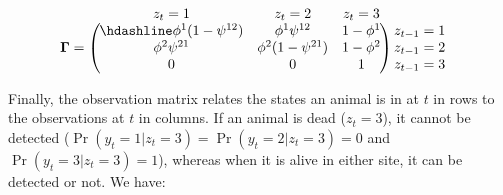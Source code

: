 \documentclass[
  12pt,
]{krantz}
\begin{document}
\[\begin{matrix}
& \\
\mathbf{\Gamma} =
    \left ( \vphantom{ \begin{matrix} 12 \\ 12 \\ 12 \end{matrix} } \right .
\end{matrix}
\hspace{-1.2em}
\begin{matrix}
    z_{t}=1 & z_{t}=2 & z_{t}=3 \\ \hdashline
\phi^1 (1-\psi^{12}) & \phi^1 \psi^{12} & 1 - \phi^1\\
\phi^2 \psi^{21} & \phi^2 (1-\psi^{21}) & 1 - \phi^2\\
0 & 0 & 1
\end{matrix}
\hspace{-0.2em}
\begin{matrix}
& \\
\left . \vphantom{ \begin{matrix} 12 \\ 12 \\ 12 \end{matrix} } \right )
    \begin{matrix}
    z_{t-1}=1 \\ z_{t-1}=2 \\ z_{t-1}=3
    \end{matrix}
\end{matrix}\]

Finally, the observation matrix relates the states an animal is in at \(t\) in rows to the observations at \(t\) in columns. If an animal is dead (\(z_t=3\)), it cannot be detected (\(\Pr(y_t=1|z_t=3)=\Pr(y_t=2|z_t=3)=0\) and \(\Pr(y_t=3|z_t=3)=1\)), whereas when it is alive in either site, it can be detected or not. We have:
\end{document}
